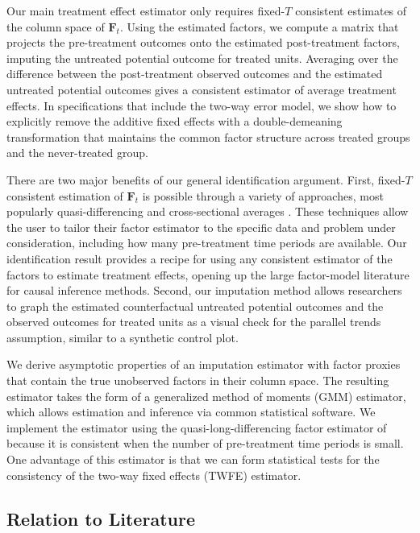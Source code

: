 \documentclass[12pt]{article}
\begin{document}
Our main treatment effect estimator only requires fixed-$T$ consistent estimates of the column space of $\bm{F}_t$. Using the estimated factors, we compute a matrix that projects the pre-treatment outcomes onto the estimated post-treatment factors, imputing the untreated potential outcome for treated units. Averaging over the difference between the post-treatment observed outcomes and the estimated untreated potential outcomes gives a consistent estimator of average treatment effects. In specifications that include the two-way error model, we show how to explicitly remove the additive fixed effects with a double-demeaning transformation that maintains the common factor structure across treated groups and the never-treated group.

There are two major benefits of our general identification argument. First, fixed-$T$ consistent estimation of $\bm{F}_t$ is possible through a variety of approaches, most popularly quasi-differencing \citep{Ahn_Lee_Schmidt_2001,Ahn_Lee_Schmidt_2013,Callaway_Karami_2020} and cross-sectional averages \citep{Westerlund_Petrova_Norkute_2019,Juodis_Sarafidis_2022,Juodis_Sarafidis2021,Brown_Schmidt_Wooldridge2021}. These techniques allow the user to tailor their factor estimator to the specific data and problem under consideration, including how many pre-treatment time periods are available. Our identification result provides a recipe for using any consistent estimator of the factors to estimate treatment effects, opening up the large factor-model literature for causal inference methods. Second, our imputation method allows researchers to graph the estimated counterfactual untreated potential outcomes and the observed outcomes for treated units as a visual check for the parallel trends assumption, similar to a synthetic control plot.

We derive asymptotic properties of an imputation estimator with factor proxies that contain the true unobserved factors in their column space. The resulting estimator takes the form of a generalized method of moments (GMM) estimator, which allows estimation and inference via common statistical software. We implement the estimator using the quasi-long-differencing factor estimator of \citet{Ahn_Lee_Schmidt_2013} because it is consistent when the number of pre-treatment time periods is small. One advantage of this estimator is that we can form statistical tests for the consistency of the two-way fixed effects (TWFE) estimator. 


\subsection*{Relation to Literature}
\end{document}
